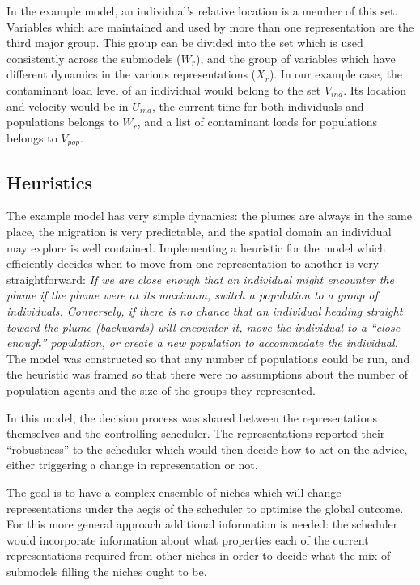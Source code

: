 In the example model, an individual's relative location is a member of this
set. Variables which are maintained and used by more than one representation
are the third major group. This group can be divided into the set which is
used consistently across the submodels ($W_r$), and the group of variables
which have different dynamics in the various representations ($X_r$). In our
example case, the contaminant load level of an individual would belong to the
set $V_{{ind}}$. Its location and velocity would be in $U_{{ind}}$,
the current time for both individuals and populations belongs to $W_r$, and a
list of contaminant loads for populations belongs to $V_{{pop}}$.



\subsection{Heuristics}

The example model has very simple dynamics: the plumes are always in the same
place, the migration is very predictable, and the spatial domain an individual
may explore is well contained. Implementing a heuristic for the model which
efficiently decides when to move from one representation to another is very
straightforward: {\em{If we are close enough that an individual might
encounter the plume if the plume were at its maximum, switch a population to a
group of individuals. Conversely, if there is no chance that an individual
heading straight toward the plume (backwards) will encounter it, move the
individual to a ``close enough'' population, or create a new population to
accommodate the individual.}\/} The model was constructed so that any number of
populations could be run, and the heuristic was framed so that there were no
assumptions about the number of population agents and the size of the groups
they represented.

In this model, the decision process was shared between the representations
themselves and the controlling scheduler.\label{Heuristics} The
representations reported their ``robustness'' to the scheduler which would
then decide how to act on the advice, either triggering a change in
representation or not.

The goal is to have a complex ensemble of niches which will change
representations under the aegis of the scheduler to optimise the global
outcome. For this more general approach additional information is needed: the
scheduler would incorporate information about what properties each of the
current representations required from other niches in order to decide what the
mix of submodels filling the niches ought to be.

